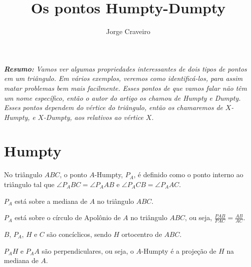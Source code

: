 \documentclass[10pt, a4paper]{article}
\title{Os pontos Humpty-Dumpty}
\author{Jorge Craveiro}
\begin{document}
	
	\zeustitle
	\begin{center}
		\begin{minipage}{0.9\textwidth}
			\itshape \textcolor{main}{\bfseries Resumo:} Vamos ver algumas propriedades interessantes de dois tipos de pontos em um triângulo.
			Em vários exemplos, veremos como identificá-los, para assim matar problemas bem mais facilmente.
			Esses pontos de que vamos falar não têm um nome específico, então o autor do artigo os chamou de Humpty e Dumpty.
			Esses pontos dependem do vértice do triângulo, então os chamaremos de $X$-Humpty, e $X$-Dumpty, aos relativos ao vértice $X$.	
		\end{minipage}
	\end{center}
	
	\section{Humpty}
	\begin{defn}
		No triângulo $ABC$, o ponto $A$-Humpty, $P_A$, é definido como o ponto interno ao triângulo tal que $\angle P_ABC = \angle P_AAB$ e $\angle P_ACB = \angle P_AAC$.
	\end{defn}
	\begin{figure}[h]
		\centering
		\def\svgwidth{0.25\columnwidth}	
		
	\end{figure}
	\begin{prop}
		$P_A$ está sobre a mediana de $A$ no triângulo $ABC$.
	\end{prop}
	\begin{prop}
		$P_A$ está sobre o círculo de Apolônio de $A$ no triângulo $ABC$, ou seja, $\frac{PAB}{PAC} = \frac{AB}{AC}$.
	\end{prop}
	\begin{prop}
		$B$, $P_A$, $H$ e $C$ são concíclicos, sendo $H$ ortocentro de $ABC$.
	\end{prop}
	\begin{prop}
		$P_AH$ e $P_AA$ são perpendiculares, ou seja, o $A$-Humpty é a projeção de $H$ na mediana de $A$.
	\end{prop}
\end{document}
